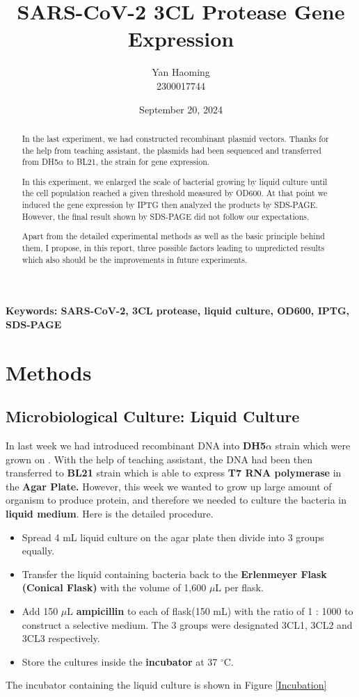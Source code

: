 \documentclass{article}
\title{SARS-CoV-2 3CL Protease Gene Expression}
\author{Yan Haoming\\2300017744}
\date{September 20, 2024}
\begin{document}
\maketitle
\begin{abstract}
    In the last experiment, we had constructed recombinant plasmid vectors.
    Thanks for the help from teaching assistant, the plasmids had been sequenced and transferred from DH5$\alpha$ to BL21, the strain for gene expression.

    In this experiment, we enlarged the scale of bacterial growing by liquid culture until the cell population reached a given threshold measured by OD600.
    At that point we induced the gene expression by IPTG then analyzed the products by SDS-PAGE.
    However, the final result shown by SDS-PAGE did not follow our expectations.

    Apart from the detailed experimental methods as well as the basic principle behind them, I propose, in this report, three possible factors leading to unpredicted results which also should be the improvements in future experiments.
\end{abstract}
\textbf{Keywords: SARS-CoV-2, 3CL protease, liquid culture, OD600, IPTG, SDS-PAGE}
\section{Methods}
\subsection{Microbiological Culture: Liquid Culture}
In last week we had introduced recombinant DNA into \textbf{DH5$\alpha$} strain which were grown on .
With the help of teaching assistant, the DNA had been then transferred to \textbf{BL21} strain which is able to express \textbf{T7 RNA polymerase} in the \textbf{Agar Plate.}
However, this week we wanted to grow up large amount of organism to produce protein, 
and therefore we needed to culture the bacteria in \textbf{liquid medium}. Here is the detailed procedure.
\begin{itemize}
    \item Spread 4 mL liquid culture on the agar plate then divide into 3 groups equally.
    \item Transfer the liquid containing bacteria back to the \textbf{Erlenmeyer Flask (Conical Flask)} with the volume of 1,600 $\mu$L per flask.
    \item Add 150 $\mu$L \textbf{ampicillin} to each of flask(150 mL) with the ratio of 1 : 1000 to construct a selective medium. 
    The 3 groups were designated 3CL1, 3CL2 and 3CL3 respectively.
    \item Store the cultures inside the \textbf{incubator} at 37 $^\circ$C.
\end{itemize} 
The incubator containing the liquid culture is shown in Figure \ref{Incubation}
\end{document}
